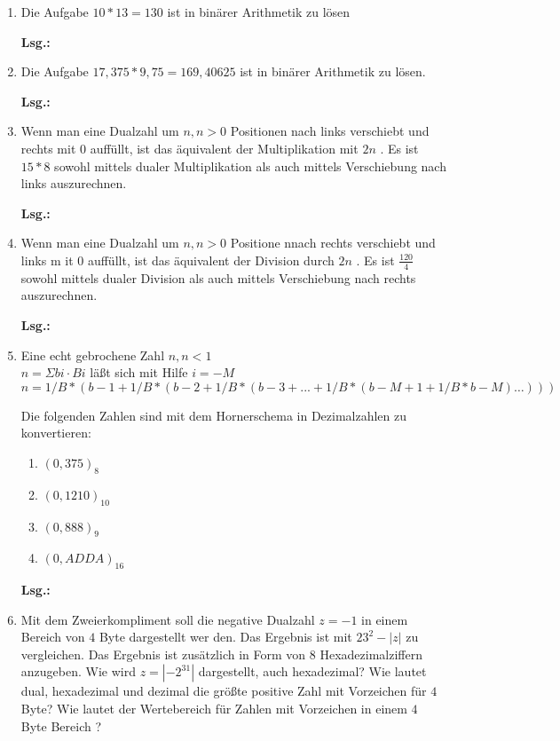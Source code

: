 \documentclass[12pt,a4paper]{scrreprt}
\newcommand{\Lsg}{\par \textbf{Lsg.: \hfill }}
\begin{document}
\begin{enumerate}
\Lsg%

\item Die Aufgabe $10*13=130$ ist in binärer Arithmetik zu lösen

\Lsg%

\item Die Aufgabe $17,375*9,75 = 169,40625$ ist in binärer Arithmetik zu lösen.

\Lsg%

\item Wenn man eine Dualzahl um $n, n>0$ Positionen nach links verschiebt und rechts mit $0$ auffüllt, ist das äquivalent der Multiplikation mit $2 n$ . Es ist $15*8$ sowohl mittels dualer Multiplikation als auch mittels Verschiebung nach links auszurechnen.

\Lsg%

\item Wenn man eine Dualzahl um $n, n>0$ Positione nnach rechts verschiebt und links m it $0$ auffüllt, ist das äquivalent der Division durch $2n$ . Es ist $\frac{120}{4}$ sowohl mittels dualer Division als auch mittels Verschiebung nach rechts auszurechnen.

\Lsg%

\item Eine echt gebrochene Zahl $n, n<1$ \\
\begin{math}
n =
\Sigma
bi \cdot B
i
\end{math}
läßt sich mit Hilfe
$i = -M$
\begin{math}
n = 1/B*(b -1 + 1 / B * ( b -2 + 1/B*(b -3 + ... + 1/B*(b -M +1 + 1 / B * b -M ) \ldots)))
\end{math}

Die folgenden Zahlen sind mit dem Hornerschema in Dezimalzahlen zu konvertieren:

\begin{enumerate}
	\item $(0,375)_8$
	\item $(0,1210)_{10}$
	\item $(0,888)_9$
	\item $(0,ADDA)_{16}$
\end{enumerate}

\Lsg%

\item Mit dem Zweierkompliment soll die negative Dualzahl $z =-1$ in einem Bereich von $4$ Byte dargestellt wer den. Das Ergebnis ist mit $23^2-|z|$ zu vergleichen. Das Ergebnis ist zusätzlich in Form von $8$ Hexadezimalziffern anzugeben. Wie wird $z=|-2^31|$ dargestellt, auch hexadezimal?
Wie lautet dual, hexadezimal und dezimal die größte positive Zahl mit Vorzeichen für $4$ Byte? Wie lautet der Wertebereich für Zahlen mit Vorzeichen in einem $4$ Byte Bereich ?


\end{enumerate}
\end{document}
